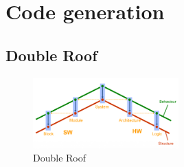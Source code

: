 \section{Code generation}
\subsection{Double Roof}
\begin{figure}[h]
	\begin{center}
		\includegraphics[width=0.5\textwidth]{images/Double_roof.png}
		\caption{Double Roof}
		\label{fig:double_roof}
	\end{center}
\end{figure}
